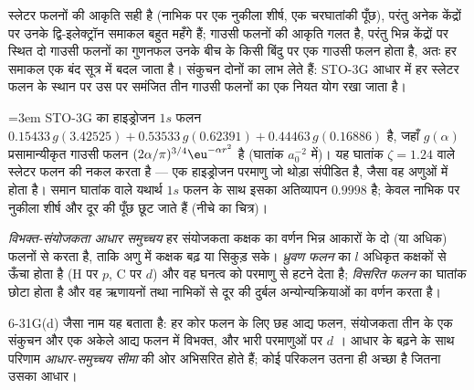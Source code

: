 स्लेटर फलनों की आकृति सही है (नाभिक पर एक नुकीला शीर्ष, एक चरघातांकी
पूँछ), परंतु अनेक केंद्रों पर उनके द्वि-इलेक्ट्रॉन समाकल बहुत
महँगे हैं; गाउसी फलनों की आकृति गलत है, परंतु भिन्न केंद्रों पर स्थित दो
गाउसी फलनों का गुणनफल उनके बीच के किसी बिंदु पर एक गाउसी फलन होता है, अतः
हर समाकल एक बंद सूत्र में बदल जाता है। संकुचन दोनों का लाभ लेते हैं:
STO-3G आधार में हर स्लेटर फलन के स्थान पर उस पर समंजित तीन गाउसी फलनों का
एक नियत योग रखा जाता है।

\begin{example}\label{ex:b3:computational-chemistry:sto3g}\emergencystretch=3em
STO-3G का हाइड्रोजन $1s$ फलन $0.15433\,g(3.42525) + 0.53533\,
g(0.62391) + 0.44463\,g(0.16886)$ है, जहाँ $g(\alpha)$ प्रसामान्यीकृत गाउसी फलन
$(2\alpha/\pi)^{3/4}\eu^{-\alpha r^2}$ है (घातांक $a_0^{-2}$ में)। यह
घातांक $\zeta = 1.24$ वाले स्लेटर फलन की नकल करता है --- एक हाइड्रोजन परमाणु जो थोड़ा
संपीडित है, जैसा वह अणुओं में होता है। समान घातांक वाले यथार्थ $1s$ फलन के साथ
इसका अतिव्यापन $0.9998$ है; केवल नाभिक पर नुकीला शीर्ष और दूर की
पूँछ छूट जाते हैं (नीचे का चित्र)।
\end{example}

\begin{definition}\label{def:b3:computational-chemistry:split-valence}
\emph{विभक्त-संयोजकता आधार समुच्चय} हर
संयोजकता कक्षक का वर्णन भिन्न आकारों के दो (या अधिक) फलनों से करता है, ताकि
अणु में कक्षक बढ़ या सिकुड़ सके। \emph{ध्रुवण
फलन} का $l$ अधिकृत कक्षकों से ऊँचा होता है
(H पर $p$, C पर $d$) और वह घनत्व को परमाणु से हटने देता है;
\emph{विसरित फलन} का घातांक छोटा होता है और वह
ऋणायनों तथा नाभिकों से दूर की दुर्बल अन्योन्यक्रियाओं का वर्णन करता है।
\end{definition}

6-31G(d) जैसा नाम यह बताता है: हर कोर फलन के लिए छह आद्य फलन, संयोजकता
तीन के एक संकुचन और एक अकेले आद्य फलन में विभक्त, और भारी परमाणुओं पर $d$
। आधार के बढ़ने के साथ परिणाम
\emph{आधार-समुच्चय सीमा} की ओर अभिसरित होते हैं; कोई परिकलन उतना ही अच्छा है जितना
उसका आधार।

